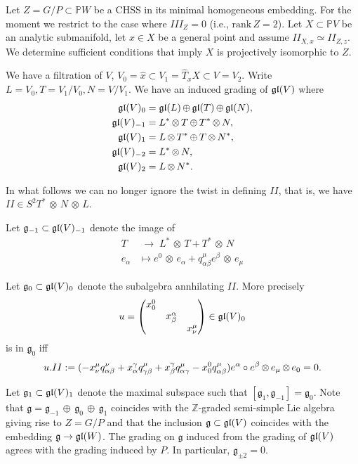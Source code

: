 \documentclass[11pt]{amsart}
\theoremstyle{definition}
\theoremstyle{remark}
\numberwithin{equation}{section}
\def\qq#1#2#3{q^{#1}_{{#2} {#3}}}
\def\trank{\text{rank}}
\def\BP{\mathbb P}
\def\BZ{\mathbb Z}
\def\fg{{\mathfrak g}}
\def\a{\alpha}
\def\b{\beta}
\def\g{\gamma}
\def\ot{{\mathord{\,\otimes }\,}}
\def\op{{\mathord{\,\oplus }\,}}
\def\ra{{\mathord{\;\rightarrow\;}}}
\def\trank{\text{rank}\,}
\begin{document}
Let $Z=G/P\subset \BP W$ be a CHSS in its minimal homogeneous embedding.
For the moment we restrict to the case where $III_Z=0$ (i.e., $\trank Z=2$).
Let $X\subset \BP V$ be an analytic submanifold, let $x\in X$ be a general point
and assume $II_{X,x}\simeq II_{Z,z}$. We determine sufficient conditions
that imply $X$ is projectively isomorphic to $Z$.



  We have a filtration of $V$, $V_0=\hat x\subset V_1= \hat T_xX\subset V=V_2$.
Write $L=V_0,T=V_1/V_0,N=V/V_1$.
We have an induced grading of $\mathfrak g\mathfrak l(V)$ where 
\begin{align*}
\fgl(V)_0&=\fgl(L)\op \fgl(T)\op \fgl(N),\\
\fgl(V)_{-1}&=L^*\ot T \op T^*\ot N,\\
\fgl(V)_{1}&=L \ot T^* \op T \ot N^*,\\
\fgl(V)_{-2}&=L^*\ot N,\\
\fgl(V)_{2}&=L\ot N^*.
\end{align*}

In what follows we can no longer ignore the twist in defining $II$,
that is, we have  $II\in S^2T^*\ot N\ot L$.

Let $\fg_{-1}\subset \fgl(V)_{-1}$ denote the image of
\begin{align*}
T&\ra L^*\ot T + T^*\ot N\\
e_{\a}&\mapsto
e^0\ot e_{\a} + \qq\mu\a\b e^{\b}\ot e_{\mu}
\end{align*}

Let $\fg_0\subset \fgl (V)_0$ denote the subalgebra annhilating $II$. More precisely
$$
u=\begin{pmatrix}\xxx 00  & & \\
 & \xxx\a\b & \\
& & \xxx\mu\nu
\end{pmatrix}\in \fgl(V)_0
$$ 
is in $\fg_0$ iff
\begin{equation}\label{g0action}
u.II:= (-\xxx\mu\nu\qq\nu\a\b +\xxx\g\a\qq\mu\g\b + \xxx\g\b\qq\mu\a\g
-\xxx 00\qq\mu\a\b)e^{\a}\circ e^{\b}\ot e_{\mu}\ot e_0 =0.
\end{equation}

Let $\fg_1\subset \fgl(V)_1$ denote the maximal subspace such that
$[\fg_1,\fg_{-1}]=\fg_0$. Note that $\fg=\fg_{-1}\op \fg_0\op \fg_1$ coincides
with the $\BZ$-graded semi-simple Lie algebra giving rise to $Z=G/P$
and that the inclusion $\fg\subset \fgl(V)$ coincides with
the embedding $\fg\ra \fgl(W)$.  
The grading
on $\fg$ induced from the grading of $\mathfrak g\mathfrak l(V)$ agrees with the grading induced by $P$.
In particular,   $\fg_{\pm 2}=0$.
 
\end{document}
